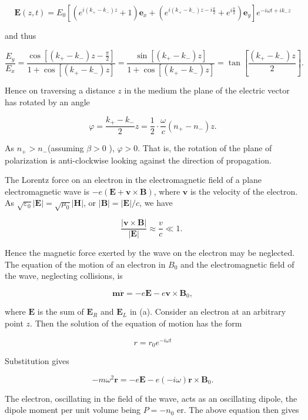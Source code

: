 \documentclass[10pt]{article}
\begin{document}
$$
\mathbf{E}(z, t)=E_{0}\left[\left(e^{i\left(k_{+}-k_{-}\right) z}+1\right) \mathbf{e}_{x}+\left(e^{i\left(k_{+}-k_{-}\right) z-i \frac{\pi}{2}}+e^{i \frac{\pi}{2}}\right) \mathbf{e}_{y}\right] e^{-i \omega t+i k_{-} z}
$$

and thus

$$
\frac{E_{y}}{E_{x}}=\frac{\cos \left[\left(k_{+}-k_{-}\right) z-\frac{\pi}{2}\right]}{1+\cos \left[\left(k_{+}-k_{-}\right) z\right]}=\frac{\sin \left[\left(k_{+}-k_{-}\right) z\right]}{1+\cos \left[\left(k_{+}-k_{-}\right) z\right]}=\tan \left[\frac{\left(k_{+}-k_{-}\right) z}{2}\right] .
$$

Hence on traversing a distance $z$ in the medium the plane of the electric vector has rotated by an angle

$$
\varphi=\frac{k_{+}-k_{-}}{2} z=\frac{1}{2} \cdot \frac{\omega}{c}\left(n_{+}-n_{-}\right) z .
$$

As $n_{+}>n_{-}$(assuming $\beta>0$ ), $\varphi>0$. That is, the rotation of the plane of polarization is anti-clockwise looking against the direction of propagation.

 The Lorentz force on an electron in the electromagnetic field of a plane electromagnetic wave is $-e(\mathbf{E}+\mathbf{v} \times \mathbf{B})$, where $\mathbf{v}$ is the velocity of the electron. As $\sqrt{\varepsilon_{0}}|\mathbf{E}|=\sqrt{\mu_{0}}|\mathbf{H}|$, or $|\mathbf{B}|=|\mathbf{E}| / c$, we have

$$
\frac{|\mathbf{v} \times \mathbf{B}|}{|\mathbf{E}|} \approx \frac{v}{c} \ll 1 \text {. }
$$

Hence the magnetic force exerted by the wave on the electron may be neglected. The equation of the motion of an electron in $B_{0}$ and the electromagnetic field of the wave, neglecting collisions, is

$$
\boldsymbol{m} \ddot{\mathbf{r}}=-e \mathbf{E}-e \mathbf{v} \times \mathbf{B}_{0},
$$

where $\mathbf{E}$ is the sum of $\mathbf{E}_{R}$ and $\mathbf{E}_{L}$ in (a). Consider an electron at an arbitrary point $z$. Then the solution of the equation of motion has the form

$$
r=r_{0} e^{-i \omega t}
$$

Substitution gives

$$
-m \omega^{2} \mathbf{r}=-e \mathbf{E}-e(-i \omega) \mathbf{r} \times \mathbf{B}_{0} .
$$

The electron, oscillating in the field of the wave, acts as an oscillating dipole, the dipole moment per unit volume being $P=-n_{0}$ er. The above equation then gives
\end{document}
